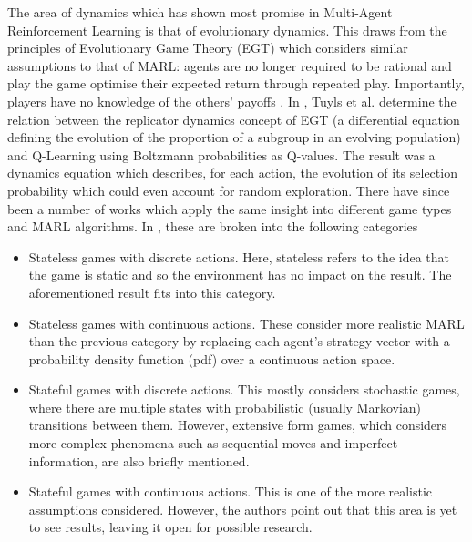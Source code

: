 \documentclass[.../main.tex]{subfiles}
\begin{document}
The area of dynamics which has shown most promise in Multi-Agent Reinforcement Learning is that of
evolutionary dynamics. This draws from the principles of Evolutionary Game Theory (EGT) which
considers similar assumptions to that of MARL: agents are no longer required to be rational and
play the game optimise their expected return through repeated play. Importantly, players have no
knowledge of the others' payoffs \cite{Tuyls2006AnGames}. In \cite{Tuyls2006AnGames}, Tuyls et al.
determine the relation between the replicator dynamics concept of EGT (a differential equation
defining the evolution of the proportion of a subgroup in an evolving population) and Q-Learning
using Boltzmann probabilities as Q-values. The result was a dynamics equation which describes, for
each action, the evolution of its selection probability which could even account for random
exploration. There have since been a number of works which apply the same insight into different
game types and MARL algorithms. In \cite{Bloembergen2015}, these are broken into the following
categories

\begin{itemize}
    \item Stateless games with discrete actions. Here, stateless refers to the idea that the game is
    static and so the environment has no impact on the result. The aforementioned result 
    \cite{Tuyls2006AnGames} fits into this category.
    \item Stateless games with continuous actions. These consider more realistic MARL than the
    previous category by replacing each agent's strategy vector with a probability density function 
    (pdf) over a continuous action space.
    \item Stateful games with discrete actions. This mostly considers stochastic games, where there
    are multiple states with probabilistic (usually Markovian) transitions between them. However,
    extensive form games, which considers more complex phenomena such as sequential moves and
    imperfect information, are also briefly mentioned.
    \item Stateful games with continuous actions. This is one of the more realistic assumptions
    considered. However, the authors point out that this area is yet to see results, leaving it open
    for possible research.
\end{itemize}
\end{document}
